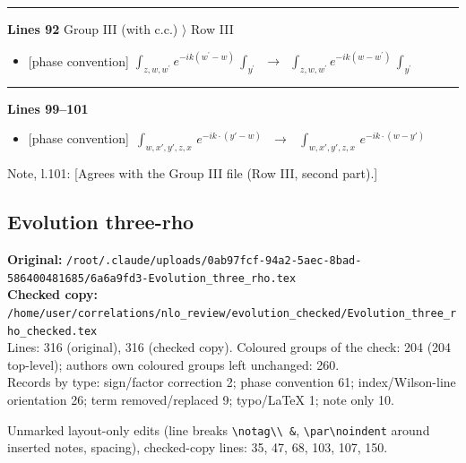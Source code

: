 \documentclass[10pt]{article}
\newenvironment{notebox}{\def\FrameCommand{{\color{notebar}\vrule width 1.5pt}\hspace{6pt}}\MakeFramed{\advance\hsize-\width\FrameRestore}\small}{\endMakeFramed}
\begin{document}
\noindent\rule{\linewidth}{0.3pt}\par\noindent\textbf{Lines 92} \quad \textsf{Group III (with c.c.) $\rangle$ Row III} \par
\begin{itemize}[leftmargin=2.2em,itemsep=1pt,topsep=2pt]
\item[\textbf{l.92}] \textsf{\small [phase convention]} $\displaystyle \int_{z,w,w^{\prime}} e^{-ik(w^{\prime}-w)}\,\int_{y^{\prime}}$\ $\longrightarrow$\ $\displaystyle \int_{z,w,w^{\prime}} e^{-ik(w-w^{\prime})}\,\int_{y^{\prime}}$
\end{itemize}
\noindent\rule{\linewidth}{0.3pt}\par\noindent\textbf{Lines 99--101} \par
\begin{itemize}[leftmargin=2.2em,itemsep=1pt,topsep=2pt]
\item[\textbf{l.99}] \textsf{\small [phase convention]} $\displaystyle \,\int_{w,x',y',z,x}\, e^{-ik\cdot (y'-w)}\,$\ $\longrightarrow$\ $\displaystyle \,\int_{w,x',y',z,x}\, e^{-ik\cdot (w-y')}\,$
\end{itemize}
\begin{notebox}\textsf{\small Note, l.101:} [Agrees with the Group III file (Row III, second part).]\end{notebox}
\bigskip
\subsection{Evolution three-rho}\label{sec:file-ev_three_rho}
\noindent\textbf{Original:} \texttt{/root/.claude/uploads/0ab97fcf-94a2-5aec-8bad-586400481685/6a6a9fd3-Evolution\_three\_rho.tex}\\\textbf{Checked copy:} \texttt{/home/user/correlations/nlo\_review/evolution\_checked/Evolution\_three\_rho\_checked.tex}\\
Lines: 316 (original), 316 (checked copy). Coloured groups of the check: 204 (204 top-level); author\textquotesingle s own coloured groups left unchanged: 260.\\
Records by type: sign/factor correction 2; phase convention 61; index/Wilson-line orientation 26; term removed/replaced 9; typo/LaTeX 1; note only 10.
\par\noindent Unmarked layout-only edits (line breaks \texttt{\textbackslash notag\textbackslash\textbackslash\ \&}, \texttt{\textbackslash par\textbackslash noindent} around inserted notes, spacing), checked-copy lines: 35, 47, 68, 103, 107, 150.
\end{document}
